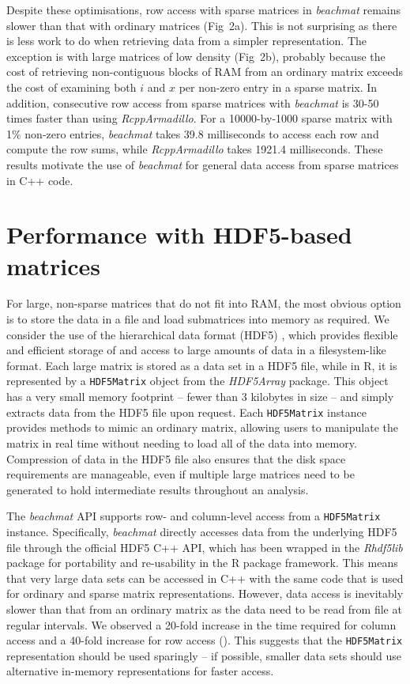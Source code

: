 \documentclass{article}
\newcommand{\beachmat}{\textit{beachmat}}
\newcommand{\code}[1]{\texttt{#1}}
\begin{document}
Despite these optimisations, row access with sparse matrices in \beachmat{} remains slower than that with ordinary matrices (Fig~2a).
This is not surprising as there is less work to do when retrieving data from a simpler representation.
The exception is with large matrices of low density (Fig~2b), probably because the cost of retrieving non-contiguous blocks of RAM from an ordinary matrix exceeds the cost of examining both $i$ and $x$ per non-zero entry in a sparse matrix.
In addition, consecutive row access from sparse matrices with \beachmat{} is 30-50 times faster than using \textit{RcppArmadillo}.
For a 10000-by-1000 sparse matrix with 1\% non-zero entries, \beachmat{} takes 39.8 milliseconds to access each row and compute the row sums, while \textit{RcppArmadillo} takes 1921.4 milliseconds.
These results motivate the use of \beachmat{} for general data access from sparse matrices in C++ code.

\section{Performance with HDF5-based matrices}
For large, non-sparse matrices that do not fit into RAM, the most obvious option is to store the data in a file and load submatrices into memory as required.
We consider the use of the hierarchical data format (HDF5) \cite{hdf5}, which provides flexible and efficient storage of and access to large amounts of data in a filesystem-like format.
Each large matrix is stored as a data set in a HDF5 file, while in R, it is represented by a \code{HDF5Matrix} object from the \textit{HDF5Array} package.
This object has a very small memory footprint -- fewer than 3 kilobytes in size -- and simply extracts data from the HDF5 file upon request.
Each \code{HDF5Matrix} instance provides methods to mimic an ordinary matrix, allowing users to manipulate the matrix in real time without needing to load all of the data into memory.
Compression of data in the HDF5 file also ensures that the disk space requirements are manageable, even if multiple large matrices need to be generated to hold intermediate results throughout an analysis.

The \beachmat{} API supports row- and column-level access from a \code{HDF5Matrix} instance.
Specifically, \beachmat{} directly accesses data from the underlying HDF5 file through the official HDF5 C++ API, which has been wrapped in the \textit{Rhdf5lib} package for portability and re-usability in the R package framework.
This means that very large data sets can be accessed in C++ with the same code that is used for ordinary and sparse matrix representations.
However, data access is inevitably slower than that from an ordinary matrix as the data need to be read from file at regular intervals.
We observed a 20-fold increase in the time required for column access and a 40-fold increase for row access (\suppfighdfspeed{}).
This suggests that the \code{HDF5Matrix} representation should be used sparingly -- if possible, smaller data sets should use alternative in-memory representations for faster access.
\end{document}
